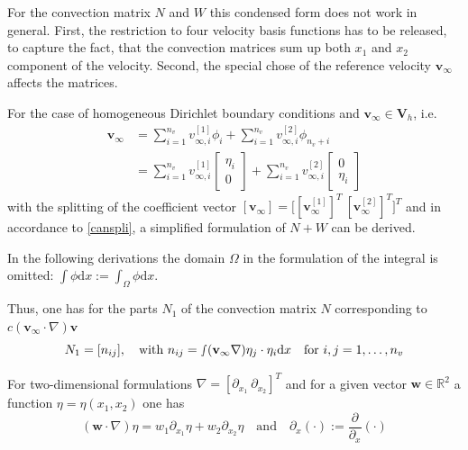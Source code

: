 \documentclass[a4paper,10pt,BCOR=15mm]{scrbook}
\providecommand{\inva}[1]{\text{d} #1}
\providecommand{\andi}[0]{\quad \text{and} \quad}
\begin{document}
For the convection matrix $N$ and $W$ this condensed form does not work in general. First, the restriction to four velocity basis functions has to be released, to capture the fact, that the convection matrices sum up both $x_1$ and $x_2$ component of the velocity. Second, the special chose of the reference velocity $\mathbf v_{\infty}$ affects the matrices.

For the case of homogeneous Dirichlet boundary conditions and $\mathbf v_\infty \in \mathbf V_h$, i.e.
\begin{align*}
 \mathbf v_\infty &= \sum _{i=1}^{n_v} v_{\infty,i}^{[1]}\phi_i+ \sum _{i=1}^{n_v} v_{\infty,i}^{[2]}\phi_{n_v+i} \\
&=\sum _{i=1}^{n_v} v_{\infty,i}^{[1]}\begin{bmatrix}  \eta_i \\  0 \end{bmatrix}+\sum _{i=1}^{n_v} v_{\infty,i}^{[2]}\begin{bmatrix}  0 \\  \eta_i \end{bmatrix}
\end{align*}
with the splitting of the coefficient vector $[\mathbf v_\infty] =\bigl [[\mathbf v_\infty ^{[1]}]^T  ~[\mathbf v_\infty ^{[2]}]^T \bigr ]^T $ and in accordance to \eqref{canspli}, a simplified formulation of $N+W$ can be derived. 

In the following derivations the domain $\Omega$ in the formulation of the integral is omitted: $\int \phi \inva x:= \int_\Omega \phi \inva x$. 

Thus, one has for the parts $N_1$ of the convection matrix $N$ corresponding to $c(\mathbf v_\infty \cdot \nabla)\mathbf v$
\begin{equation*}
 N_1= [n_{ij} ] , \quad \text {with  } n_{ij}=\smallint (\mathbf v_\infty \nabla) \eta_j \cdot \eta_i \inva x\quad \text{for  } i,j=1,\dotsc,n_v
\end{equation*}

For two-dimensional formulations $\nabla = [\partial_{x_1}~\partial_{x_2}]^T$ and for a given vector $\mathbf w \in \mathbb R^2$ a function $\eta = \eta(x_1,x_2)$ one has 
\begin{equation*}
 (\mathbf w \cdot \nabla) \eta = w_1\partial_{x_1}\eta + w_2\partial_{x_2}\eta \andi \partial_{x}(\cdot):=\frac{\partial}{\partial_{x}}(\cdot)
\end{equation*}
\end{document}
